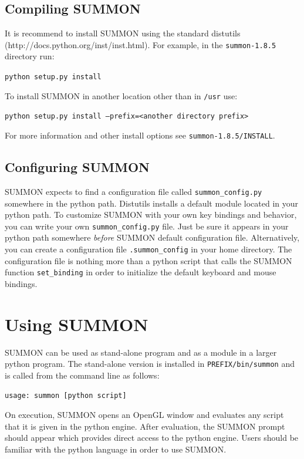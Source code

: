 \documentclass[12pt]{article}
\newcommand{\code}[1]{{\tt #1}}
\newcommand{\codeblock}[1]{\vspace{.1in} {\tt #1} \vspace{.1in}}
\newcommand{\version}{1.8.5}
\begin{document}
\subsection{Compiling SUMMON}

It is recommend to install SUMMON using the standard distutils 
(http://docs.python.org/inst/inst.html).  For example, in the
\code{summon-\version} directory run:

\codeblock{python setup.py install}

To install SUMMON in another location other than in \code{/usr} use:

\codeblock{python setup.py install --prefix=<another directory prefix>}

For more information and other install options see 
\code{summon-\version/INSTALL}.


\subsection{Configuring SUMMON}

SUMMON expects to find a configuration file called  \code{summon\_config.py}
somewhere in the python path.  Distutils installs a default module located in
your python path.  To customize SUMMON with your own key bindings and behavior,
you can write your own \code{summon\_config.py} file.  Just be sure it appears
in your python path somewhere {\em before} SUMMON default configuration file. 
Alternatively, you can create a configuration file \code{.summon\_config} in
your home directory.  The configuration file is nothing more than a python
script that calls the SUMMON function  \code{set\_binding} in order to
initialize the default keyboard and mouse  bindings.



\section{Using SUMMON}
\label{sec:using}

SUMMON can be used as stand-alone program and as a module in a larger python
program.  The stand-alone version is installed in \code{PREFIX/bin/summon} and
is called from the command line as follows:

\codeblock{usage: summon [python script]}

On execution, SUMMON opens an OpenGL window and evaluates any script that it is
given in the python engine. After evaluation, the SUMMON prompt should appear
which provides direct access to the python engine.  Users should be familiar
with the python language in order to use SUMMON.
\end{document}
